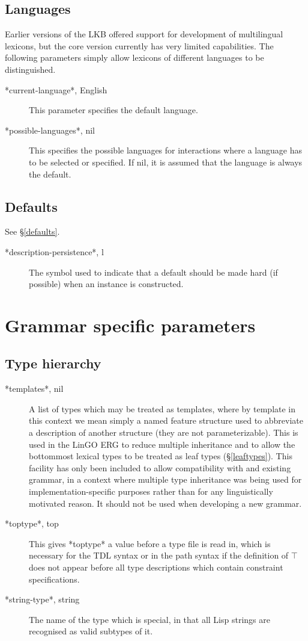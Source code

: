 \documentclass[12pt]{report}
\begin{document}
\subsection{Languages}
\label{langglob}
Earlier versions of the LKB offered support for development of
multilingual lexicons, but the core version currently
has very limited capabilities.  The following
parameters simply allow lexicons of different languages to be distinguished.
\begin{description}
\item[*current-language*, English]
This parameter specifies the default language.
\item[*possible-languages*, nil]
This specifies the possible languages for interactions
where a language has to be selected or specified.  If nil,
it is assumed that the language is always the default.
\end{description}

\subsection{Defaults}
\label{defglob}
See \S\ref{defaults}.
\begin{description}
\item[ *description-persistence*, l]
The symbol used to indicate that a default should be
made hard (if possible) when an instance is constructed.
\end{description}

\section{Grammar specific parameters}
\label{gramglob}
\subsection{Type hierarchy}
\label{thierglob}
\begin{description}
\item [*templates*, nil] A list of types which may be treated as 
templates, where by template in this context we mean simply a named
feature structure used to abbreviate a description of another structure
(they are not parameterizable).
This is used in the LinGO ERG to reduce multiple inheritance
and to allow the bottommost lexical types to be treated as leaf types
(\S\ref{leaftypes}).  This facility has only been included to allow
compatibility with and existing grammar, in a context where
multiple type inheritance was being used for implementation-specific 
purposes rather than for any linguistically motivated reason.
It should not be used when developing a new grammar.
\item [*toptype*, top] This gives *toptype* a value before a type file
is read in, which is necessary for the TDL syntax or in the path syntax
if the definition of $\top$ does not
appear before all type descriptions which contain constraint specifications.
\item [*string-type*, string] The name of the type which is special, in that
all Lisp strings are recognised as valid subtypes of it.
\end{description}
\end{document}
